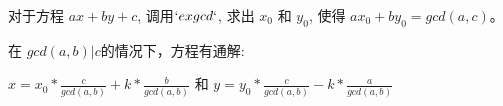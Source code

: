对于方程 $ax + by + c$, 调用$`exgcd`$, 求出 $x_0$ 和 $y_0$,
使得 $ax_0 + by_0 = gcd(a, c)$。

在 $gcd(a, b) | c$的情况下，方程有通解:

$x = x_0 * \frac{c}{gcd(a, b)} + k * \frac{b}{gcd(a, b)}$ 和
$y = y_0 * \frac{c}{gcd(a, b)} - k * \frac{a}{gcd(a, b)}$
